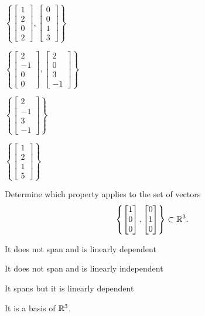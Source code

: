 \documentclass{article}
\begin{document}
\begin{readinessAssuranceTest}
\begin{multicols}{4}
\begin{readinessAssuranceTestChoices}
\item $\left\{ \begin{bmatrix} 1 \\ 2 \\ 0 \\ 2 \end{bmatrix}, \begin{bmatrix} 0 \\ 0 \\ 1 \\ 3 \end{bmatrix} \right\}$
\item $\left\{ \begin{bmatrix} 2 \\ -1 \\ 0 \\ 0 \end{bmatrix}, \begin{bmatrix} 2 \\ 0 \\ 3 \\ -1 \end{bmatrix} \right\}$
\item $\left\{ \begin{bmatrix} 2 \\ -1 \\ 3 \\ -1 \end{bmatrix} \right\}$
\item $\left\{ \begin{bmatrix} 1 \\ 2 \\ 1 \\ 5 \end{bmatrix} \right\}$
\end{readinessAssuranceTestChoices}
\end{multicols}


\item Determine which property applies to the set of vectors $$\left\{ \begin{bmatrix}  1 \\ 0 \\ 0 \end{bmatrix}, \begin{bmatrix} 0 \\ 1 \\ 0 \end{bmatrix} \right\} \subset \mathbb{R}^3.$$
\begin{readinessAssuranceTestChoices}
\item It does not span and is linearly dependent
\item It does not span and is linearly independent %
\item It spans but it is linearly dependent
\item It is a basis of $\mathbb{R}^3$.
\end{readinessAssuranceTestChoices}



\end{readinessAssuranceTest}
\end{document}
